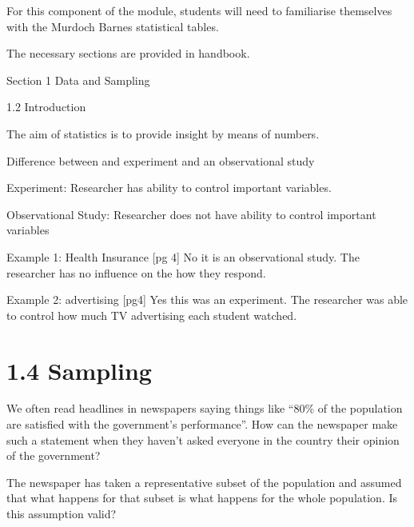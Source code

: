 \documentclass[]{report}
\begin{document}
\newpage

For this component of the module, students will need to familiarise themselves with the Murdoch Barnes statistical tables.

The necessary sections are provided in handbook.

Section 1 Data and Sampling


1.2   Introduction 

The aim of statistics is to provide insight by means of numbers.

Difference between and experiment and an observational study

Experiment: Researcher has ability to control important variables.

Observational Study: Researcher does not have ability to control important variables



Example 1:  Health Insurance [pg 4]
No it is an observational study. The researcher has no influence on the how they respond.

Example 2:  advertising  [pg4]
Yes this was an experiment. The researcher was able to control how much TV advertising each student watched.




\section{1.4   Sampling}

We often read headlines in newspapers saying things like “80\% of the population are satisfied with the government’s performance”. How can the newspaper make such a statement when they haven’t asked everyone in the country their opinion of the government? 

The newspaper has taken a representative subset of the population and assumed that what happens for that subset is what happens for the whole population. Is this assumption valid? 




\end{document}
